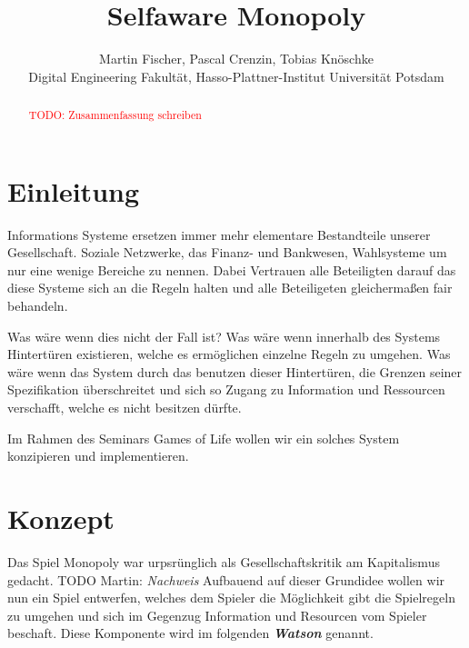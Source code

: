 \documentclass[german]{cgspaper} %
\title{Selfaware Monopoly}
\author{Martin Fischer, Pascal Crenzin, Tobias Knöschke\\ Digital Engineering Fakultät, Hasso-Plattner-Institut \textbar{} Universität Potsdam}
\newcommand{\todo}[1]{\textit{#1}}
\newcommand{\Martin}[1]{\textcolor{colorMartin}{TODO Martin:} \todo{#1} }
\newcommand{\neuerBegriff}[1]{\textbf{\textit{#1}}}
\begin{document}

\maketitle

\begin{abstract}
    \textcolor{red}{TODO: Zusammenfassung schreiben}
\end{abstract}

\copyrightspace %


\section{Einleitung}

Informations Systeme ersetzen immer mehr elementare Bestandteile unserer Gesellschaft.
Soziale Netzwerke, das Finanz- und Bankwesen, Wahlsysteme um nur eine wenige Bereiche zu nennen.
Dabei Vertrauen alle Beteiligten darauf das diese Systeme sich an die Regeln halten und alle Beteiligeten gleichermaßen fair behandeln.

Was wäre wenn dies nicht der Fall ist? 
Was wäre wenn innerhalb des Systems Hintertüren existieren, welche es ermöglichen einzelne Regeln zu umgehen.
Was wäre wenn das System durch das benutzen dieser Hintertüren, die Grenzen seiner Spezifikation überschreitet und sich so Zugang zu Information und Ressourcen verschafft, welche es nicht besitzen dürfte.

Im Rahmen des Seminars Games of Life wollen wir ein solches System konzipieren und implementieren.

\section{Konzept}

Das Spiel Monopoly war urpsrünglich als Gesellschaftskritik am Kapitalismus gedacht. \Martin{Nachweis} 
Aufbauend auf dieser Grundidee wollen wir nun ein Spiel entwerfen, welches dem Spieler die Möglichkeit gibt die Spielregeln zu umgehen und sich im Gegenzug Information und Resourcen vom Spieler beschaft. 
Diese Komponente wird im folgenden \neuerBegriff{Watson} genannt.
\end{document}
